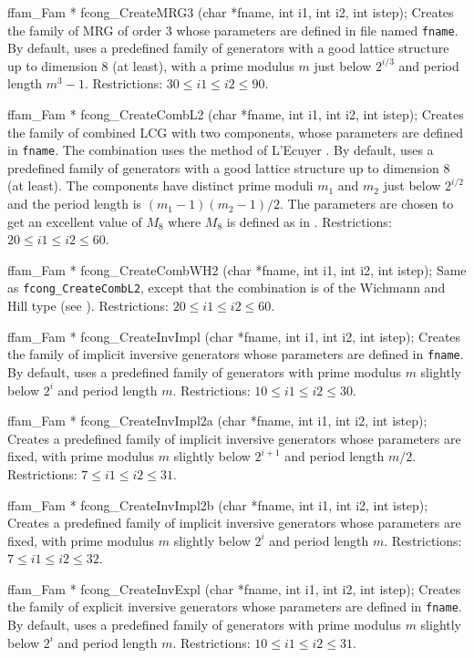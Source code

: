 ffam_Fam * fcong_CreateMRG3 (char *fname, int i1, int i2, int istep);
\endcode
\tab
 Creates the family of MRG of order 3 whose parameters are defined in 
 file named {\tt fname}.
 By default, uses a predefined family of generators with
 a good lattice structure up to dimension 8 (at least), with a prime
 modulus $m$ just below $2^{i/3}$ and period length $m^3-1$.
 Restrictions: $ 30 \le i1 \le i2 \le 90$.
\endtab
\code


ffam_Fam * fcong_CreateCombL2 (char *fname, int i1, int i2, int istep);
\endcode
\tab
 Creates the family of combined LCG with two components,  whose
 parameters are defined in {\tt fname}.
 The combination uses the method of L'Ecuyer \cite{rLEC88a}.
 By default, uses a predefined family of generators
 with a good lattice structure up to dimension 8 (at least).
 The components have distinct prime moduli $m_1$ and $m_2$ 
 just below $2^{i/2}$ and the period length is $(m_1-1)(m_2-1)/2$.
 The parameters are chosen to get an excellent value of $M_8$
 where $M_8$ is defined as in \cite{rLEC99c}.
 Restrictions: $20 \le i1 \le i2 \le 60$.
\endtab
\code


ffam_Fam * fcong_CreateCombWH2 (char *fname, int i1, int i2, int istep);
\endcode
\tab
 Same as {\tt fcong\_CreateCombL2}, except that the combination is of the
 Wichmann and Hill type (see \cite{rLEC91b}).
 Restrictions: $20 \le i1 \le i2 \le 60$.
\endtab
\code


ffam_Fam * fcong_CreateInvImpl (char *fname, int i1, int i2, int istep);
\endcode
\tab
 Creates the family of implicit inversive generators  whose
 parameters are defined in {\tt fname}. By default, uses a
 predefined family of generators with prime modulus $m$
 slightly below $2^i$ and period length $m$.
 Restrictions: $10 \le i1 \le i2 \le 30$.
\endtab
\code


ffam_Fam * fcong_CreateInvImpl2a (char *fname, int i1, int i2, int istep);
\endcode
\tab
 Creates a predefined family of implicit inversive generators whose
 parameters are fixed, with prime modulus $m$
 slightly below $2^{i+1}$ and period length $m/2$.
 Restrictions: $7 \le i1 \le i2 \le 31$.
\endtab
\code


ffam_Fam * fcong_CreateInvImpl2b (char *fname, int i1, int i2, int istep);
\endcode
\tab
 Creates a predefined family of implicit inversive generators whose
 parameters are fixed, with prime modulus $m$
 slightly below $2^i$ and period length $m$.
 Restrictions: $7 \le i1 \le i2 \le 32$.
\endtab
\code


ffam_Fam * fcong_CreateInvExpl (char *fname, int i1, int i2, int istep);
\endcode
\tab
 Creates the family of explicit inversive generators  whose
 parameters are defined in {\tt fname}. By default, uses a
 predefined family of generators with prime modulus $m$
 slightly below $2^i$ and period length $m$.
 Restrictions: $10 \le i1 \le i2 \le 31$.
\endtab
\code


